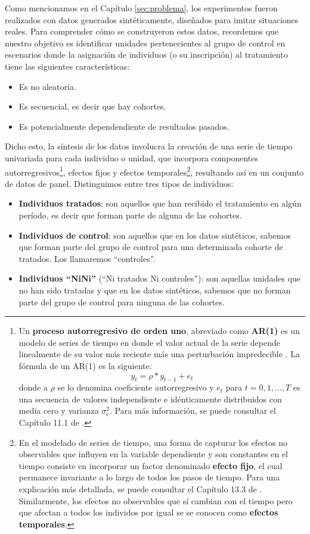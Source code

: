 \documentclass[../../main.tex]{subfiles}
\begin{document}
Como mencionamos en el Capítulo \ref{sec:problema}, los experimentos fueron realizados con
datos generados sintéticamente, diseñados para imitar situaciones reales. Para comprender
cómo se construyeron estos datos, recordemos que nuestro objetivo es identificar
unidades pertenecientes al grupo de control en escenarios donde la asignación de
individuos (o su inscripción) al tratamiento tiene las siguientes características:
\begin{itemize}[itemsep=0.05cm]
    \item Es no aleatoria.
    \item Es secuencial, es decir que hay cohortes.
    \item Es potencialmente dependendiente de resultados pasados.
\end{itemize}

Dicho esto, la síntesis de los datos involucra la creación de una serie de tiempo
univariada para cada individuo o unidad, que incorpora componentes autorregresivos\footnote{Un
\textbf{proceso autorregresivo de orden uno}, abreviado como \textbf{AR(1)} es un modelo
de series de tiempo en donde el valor actual de la serie depende linealmente de su valor
más reciente más una perturbación impredecible \cite{intro-econometria-wooldridge}. La
fórmula de un AR(1) es la siguiente:
\[
    y_t = \rho * y_{t-1} + e_t
\]
donde a \(\rho\) se lo denomina coeficiente autorregresivo y \(e_t\) para \(t=0,1,...,T\)
es una secuencia de valores independiente e idénticamente distribuidos con media cero y
varianza \(\sigma_e^2\). Para más información, se puede consultar el Capítulo 11.1 de
\cite{intro-econometria-wooldridge}.}, efectos fijos y efectos temporales\footnote{En el
modelado de series de tiempo, una forma de capturar los efectos no observables que
influyen en la variable dependiente y son constantes en el tiempo consiste en incorporar
un factor denominado \textbf{efecto fijo}, el cual permanece invariante a lo largo de
todos los pasos de tiempo. Para una explicación más detallada, se puede consultar el
Capítulo 13.3 de \cite{intro-econometria-wooldridge}. Similarmente, los efectos no
observables que sí cambian con el tiempo pero que afectan a todos los individos por igual
se se conocen como \textbf{efectos temporales}.}, resultando así en un conjunto de datos
de panel. Distinguimos entre tres tipos de individuos:

\begin{itemize}[itemsep=0.1cm]
    \item \textbf{Individuos tratados}: son aquellos que han recibido el tratamiento en
    algún período, es decir que forman parte de alguna de las cohortes.
    \item \textbf{Individuos de control}: son aquellos que en los datos sintéticos,
    sabemos que forman parte del grupo de control para una determinada cohorte de
    tratados. Los llamaremos ``controles''.
    \item \textbf{Individuos ``NiNi''} (``Ni tratados Ni controles''): son aquellas
    unidades que no han sido tratadas y que en los datos sintéticos, sabemos que no forman
    parte del grupo de control para ninguna de las cohortes.
\end{itemize}
\end{document}
